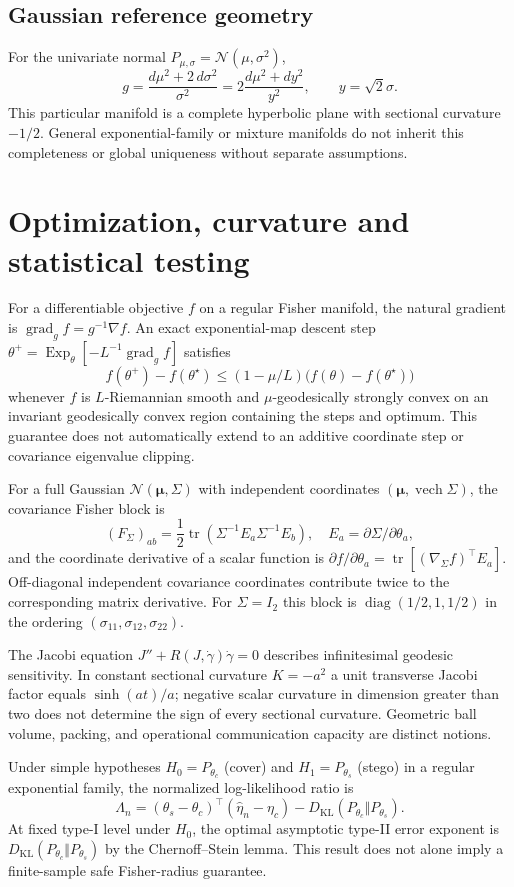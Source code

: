 \documentclass[preprint,12pt]{elsarticle}
\newcommand{\KL}{D_{\mathrm{KL}}}
\newcommand{\Exp}{\operatorname{Exp}}
\newcommand{\cN}{\mathcal N}
\begin{document}
\subsection{Gaussian reference geometry}
For the univariate normal $P_{\mu,\sigma}=\cN(\mu,\sigma^2)$,
\[
 g=\frac{d\mu^2+2\,d\sigma^2}{\sigma^2}
   =2\frac{d\mu^2+dy^2}{y^2},\qquad y=\sqrt2\sigma.
\]
This particular manifold is a complete hyperbolic plane with
sectional curvature $-1/2$. General exponential-family or
mixture manifolds do not inherit this completeness or
global uniqueness without separate assumptions.


\section{Optimization, curvature and statistical testing}
For a differentiable objective $f$ on a regular Fisher
manifold, the natural gradient is
$\operatorname{grad}_g f=g^{-1}\nabla f$.
An exact exponential-map descent step
$\theta^+=\Exp_\theta[-L^{-1}\operatorname{grad}_g f]$
satisfies
\[
 f(\theta^+)-f(\theta^\star)\le
 (1-\mu/L)\bigl(f(\theta)-f(\theta^\star)\bigr)
\]
whenever $f$ is $L$-Riemannian smooth and
$\mu$-geodesically strongly convex on an invariant
geodesically convex region containing the steps and optimum.
This guarantee does not automatically extend to an
additive coordinate step or covariance eigenvalue clipping.


For a full Gaussian $\cN(\bm\mu,\Sigma)$ with independent
coordinates $(\bm\mu,\operatorname{vech}\Sigma)$, the
covariance Fisher block is
\[
 (F_\Sigma)_{ab}=\frac12\operatorname{tr}
 (\Sigma^{-1}E_a\Sigma^{-1}E_b),
 \quad E_a=\partial\Sigma/\partial\theta_a,
\]
and the coordinate derivative of a scalar function is
$\partial f/\partial\theta_a=
\operatorname{tr}[(\nabla_\Sigma f)^\top E_a]$.
Off-diagonal independent covariance coordinates contribute
twice to the corresponding matrix derivative.
For $\Sigma=I_2$ this block is
$\operatorname{diag}(1/2,1,1/2)$ in the ordering
$(\sigma_{11},\sigma_{12},\sigma_{22})$.


The Jacobi equation
$J''+R(J,\dot\gamma)\dot\gamma=0$
describes infinitesimal geodesic sensitivity. In constant
sectional curvature $K=-a^2$ a unit transverse Jacobi factor
equals $\sinh(at)/a$; negative scalar curvature in dimension
greater than two does not determine the sign of every
sectional curvature. Geometric ball volume, packing, and
operational communication capacity are distinct notions.


Under simple hypotheses $H_0=P_{\theta_c}$ (cover) and
$H_1=P_{\theta_s}$ (stego) in a regular exponential family,
the normalized log-likelihood ratio is
\[
 \Lambda_n=(\theta_s-\theta_c)^\top
  (\widehat\eta_n-\eta_c)-
  \KL(P_{\theta_c}\Vert P_{\theta_s}).
\]
At fixed type-I level under $H_0$, the optimal asymptotic
type-II error exponent is
$\KL(P_{\theta_c}\Vert P_{\theta_s})$ by the
Chernoff--Stein lemma. This result does not alone imply
a finite-sample safe Fisher-radius guarantee.
\end{document}
